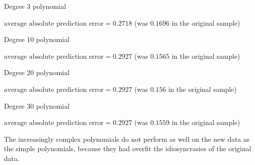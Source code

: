 \documentclass{beamer}\usepackage[]{graphicx}\usepackage[]{color}
\newenvironment{knitrout}{}{} %
\begin{document}
\begin{darkframes}
    \begin{frame}{Degree 3 polynomial}
\begin{knitrout}


\end{knitrout}
      \vspace{-1cm} $\text{average absolute prediction error} = 0.2718$
      (was $0.1696$ in the original sample)
    \end{frame}

    \begin{frame}{Degree 10 polynomial}
\begin{knitrout}


\end{knitrout}
      \vspace{-1cm} $\text{average absolute prediction error} = 0.2927$
      (was $0.1565$ in the original sample)
    \end{frame}

    \begin{frame}{Degree 20 polynomial}
\begin{knitrout}


\end{knitrout}
      \vspace{-1cm} $\text{average absolute prediction error} = 0.2927$
      (was $0.156$ in the original sample)
    \end{frame}

    \begin{frame}{Degree 30 polynomial}
\begin{knitrout}


\end{knitrout}
      \vspace{-1cm} $\text{average absolute prediction error} = 0.2927$
      (was $0.1559$ in the original sample)
    \end{frame}

    \begin{frame}
      The increasingly complex polynomials do not perform as well on the new data as the simple polynomials, because they had \alert{overfit} the idiosyncrasies of the original data.


\end{frame}
\end{darkframes}
\end{document}
